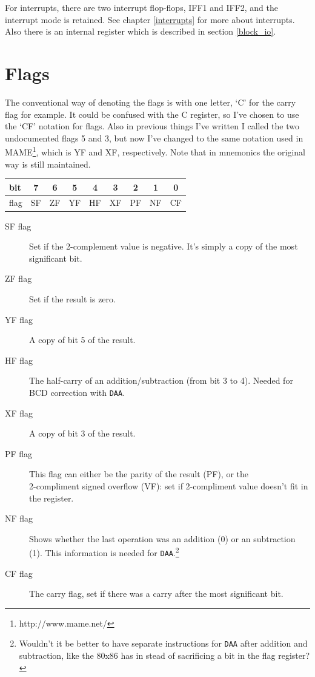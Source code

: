 \documentclass[oneside,a4paper]{book}
\begin{document}
For interrupts, there are two interrupt flop-flops, IFF1 and IFF2, and the 
interrupt mode is retained. See chapter \ref{interrupts} for more about
interrupts. Also there is an internal register which is described in section 
\ref{block_io}.

\section{Flags}
\label{flags}

The conventional way of denoting the flags is with one letter, `C' for
the carry flag for example. It could be confused with the C register, so I've
chosen to use the `CF' notation for flags. Also in previous things I've
written I called the two undocumented flags 5 and 3, but now I've changed
to the same notation used in MAME\footnote{http://www.mame.net/}, which is
YF and XF, respectively. Note that in mnemonics the original way is still
maintained.\\[0.5ex]

\begin{tabular}{|l|c|c|c|c|c|c|c|c|} \hline
bit & 7 & 6 & 5 & 4 & 3 & 2 & 1 & 0 \\ \hline
flag & SF & ZF & YF & HF & XF & PF & NF & CF \\ \hline
\end{tabular}

\begin{description}

\item[SF flag]
  Set if the 2-complement value is negative. It's simply a copy of the most 
  significant bit.

\item[ZF flag]
  Set if the result is zero.

\item[YF flag]
  A copy of bit 5 of the result.

\item[HF flag]
  The half-carry of an addition/subtraction (from bit 3 to 4). Needed for
  BCD correction with {\tt DAA}.

\item[XF flag]
  A copy of bit 3 of the result.

\item[PF flag]
  This flag can either be the parity of the result (PF), or the \\ 2-compliment
  signed overflow (VF): set if 2-compliment value doesn't fit in the register.

\item[NF flag]
  Shows whether the last operation was an addition (0) or an subtraction (1).
  This information is needed for {\tt DAA}.\footnote{Wouldn't it be better to
  have separate instructions for {\tt DAA} after addition and subtraction, 
  like the 80x86 has in stead of sacrificing a bit in the flag register?}

\item[CF flag]
  The carry flag, set if there was a carry after the most significant bit.

\end{description}
\end{document}
